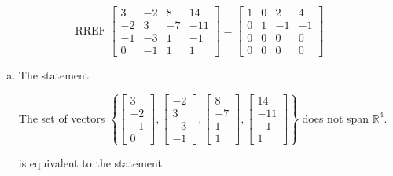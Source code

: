 \begin{exerciseAnswer} 


\[\operatorname{RREF} \left[\begin{array}{cccc}
3 & -2 & 8 & 14 \\
-2 & 3 & -7 & -11 \\
-1 & -3 & 1 & -1 \\
0 & -1 & 1 & 1
\end{array}\right] = \left[\begin{array}{cccc}
1 & 0 & 2 & 4 \\
0 & 1 & -1 & -1 \\
0 & 0 & 0 & 0 \\
0 & 0 & 0 & 0
\end{array}\right] \]


\begin{enumerate}[(a)]
\item The statement 
\begin{center}\begin{minipage}{0.8\textwidth}
 The set of vectors \( \left\{ \left[\begin{array}{c}
3 \\
-2 \\
-1 \\
0
\end{array}\right] , \left[\begin{array}{c}
-2 \\
3 \\
-3 \\
-1
\end{array}\right] , \left[\begin{array}{c}
8 \\
-7 \\
1 \\
1
\end{array}\right] , \left[\begin{array}{c}
14 \\
-11 \\
-1 \\
1
\end{array}\right] \right\} \) does not span \(\mathbb{R}^4\). 
\end{minipage}\end{center}
     is equivalent to the statement 
\begin{center}\begin{minipage}{0.8\textwidth}
 The vector equation \( x_{1} \left[\begin{array}{c}
3 \\
-2 \\

\end{array}
\end{minipage}
\end{center}
\end{enumerate}
\end{exerciseAnswer}
